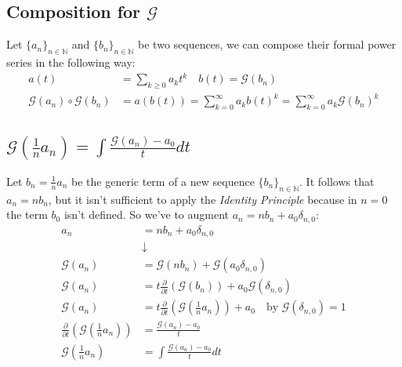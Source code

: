 \subsection{Composition for $\mathcal{G} $}

Let $\{a_n\}_{n\in\mathbb{N} } $ and $\{b_n\}_{n\in\mathbb{N} } $ be
two sequences, we can compose their formal power series in the
following way:
\begin{displaymath}
  \begin{split}
    a(t) &= \sum_{k\geq 0}{a_k t^k} \quad b(t)= \mathcal{G} (b_n) \\
    \mathcal{G} (a_n) \circ \mathcal{G}(b_n) &= a(b(t)) =
    \sum_{k=0}^{\infty}{a_k b(t)^k}=
    \sum_{k=0}^{\infty}{a_k \mathcal{G} (b_n)^k}
  \end{split}
\end{displaymath}

\subsection{$\mathcal{G} ( \frac{1}{n} a_n) = \int{ \frac{\mathcal{G}
      (a_n) - a_0}{t}dt }$}

Let $b_n = \frac{1}{n} a_n$ be the generic term of a new sequence
$\{b_n\}_{n\in\mathbb{N} } $. It follows that $a_n = n b_n$, but it
isn't sufficient to apply the \emph{Identity Principle} because in
$n=0$ the term $b_0$ isn't defined. So we've to augment $a_n = n b_n +
a_0\delta_{n,0}$:
\begin{displaymath}
  \begin{split}
    a_n &= n b_n + a_0\delta_{n,0} \\
    &\downarrow \\
    \mathcal{G} (a_n) &= \mathcal{G} (n b_n) + \mathcal{G}
    (a_0\delta_{n,0})\\
    \mathcal{G} (a_n) &= t \frac{\partial}{\partial t}\left(
      \mathcal{G} ( b_n) \right) + a_0\mathcal{G} (\delta_{n,0})  \\
    \mathcal{G} (a_n) &= t \frac{\partial}{\partial t}\left(
      \mathcal{G} ( \frac{1}{n} a_n) \right) + a_0 \quad \text{by }
    \mathcal{G} (\delta_{n,0}) = 1\\
    \frac{\partial}{\partial t}\left( \mathcal{G} ( \frac{1}{n} a_n)
    \right) &= \frac{\mathcal{G} (a_n) - a_0}{t}\\
    \mathcal{G} ( \frac{1}{n} a_n) &=\int{ \frac{\mathcal{G} (a_n) -
        a_0}{t}dt}
  \end{split}
\end{displaymath}

